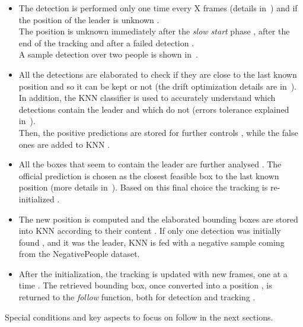 \begin{itemize}
	\item The detection is performed  only one time every X frames (details in~) and if the position of the leader is unknown .\\
	The position is unknown immediately after the \textit{slow start} phase , after the end of the tracking  and after a failed detection .\\
	A sample detection over two people is shown in~.
	
	\item All the detections are elaborated  to check if they are close to the last known position  and so it can be kept or not (the drift optimization details are in~). In addition, the KNN classifier is used  to accurately understand which detections contain the leader and which do not (errors tolerance explained in~).\\
	Then, the positive predictions are stored for further controls , while the false ones are added to KNN .
	
	\item All the boxes that seem to contain the leader are further analysed . The official prediction is chosen as the closest feasible box to the last known position  (more details in~). Based on this final choice the tracking is re-initialized .

	\item The new position is computed  and the elaborated bounding boxes are stored into KNN according to their content . If only one detection was initially found , and it was the leader, KNN is fed with a negative sample  coming from the NegativePeople dataset.
	
	\item After the initialization, the tracking is updated with new frames, one at a time . The retrieved bounding box, once converted into a position , is returned to the \textit{follow} function, both for detection and tracking .
\end{itemize}
Special conditions and key aspects to focus on follow in the next sections.
